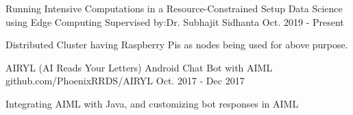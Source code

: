 


\begin{cventries}


\cventry
{Running Intensive Computations in a Resource-Constrained Setup} %
{Data Science using Edge Computing} %
{Supervised by:\newline Dr. Subhajit Sidhanta} %
{Oct. 2019 - Present} %
{ %
\begin{cvitems}
\item {Distributed Cluster having Raspberry Pis as nodes being used for above purpose.}
\end{cvitems}
}


\cventry
{AIRYL (AI Reads Your Letters)} %
{Android Chat Bot with AIML} %
{github.com/PhoenixRRDS/AIRYL} %
{Oct. 2017 - Dec 2017} %
{ %
\begin{cvitems}
\item {Integrating AIML with Java, and customizing bot responses in AIML}
\end{cvitems}
}




\end{cventries}